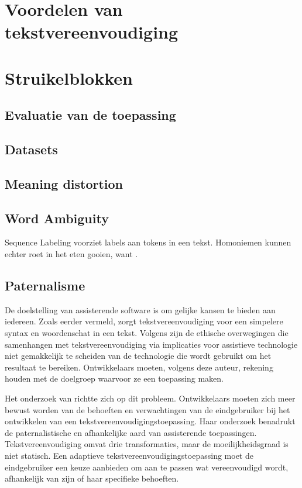 \section{Voordelen van tekstvereenvoudiging}

\section{Struikelblokken}

\subsection{Evaluatie van de toepassing}

\subsection{Datasets}

\subsection{Meaning distortion}

\subsection{Word Ambiguity}

Sequence Labeling voorziet labels aan tokens in een tekst. Homoniemen kunnen echter roet in het eten gooien, want . 

\subsection{Paternalisme}
De doelstelling van assisterende software is om gelijke kansen te bieden aan iedereen. Zoals eerder vermeld, zorgt tekstvereenvoudiging voor een simpelere syntax en woordenschat in een tekst. Volgens \textcite{Niemeijer2010} zijn de ethische overwegingen die samenhangen met tekstvereenvoudiging via implicaties voor assistieve technologie niet gemakkelijk te scheiden van de technologie die wordt gebruikt om het resultaat te bereiken. Ontwikkelaars moeten, volgens deze auteur, rekening houden met de doelgroep waarvoor ze een toepassing maken.

Het onderzoek van \textcite{Gooding2022} richtte zich op dit probleem. Ontwikkelaars moeten zich meer bewust worden van de behoeften en verwachtingen van de eindgebruiker bij het ontwikkelen van een tekstvereenvoudigingstoepassing. Haar onderzoek benadrukt de paternalistische en afhankelijke aard van assisterende toepassingen. Tekstvereenvoudiging omvat drie transformaties, maar de moeilijkheidsgraad is niet statisch. Een adaptieve tekstvereenvoudigingstoepassing moet de eindgebruiker een keuze aanbieden om aan te passen wat vereenvoudigd wordt, afhankelijk van zijn of haar specifieke behoeften.

